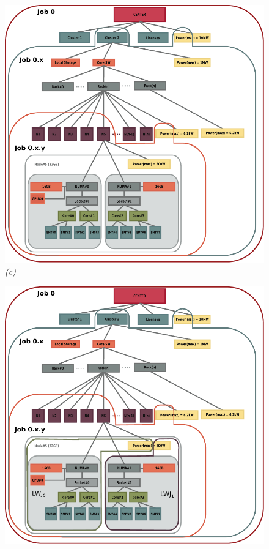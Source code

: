 \documentclass[10pt]{article}
\begin{document}
\begin{figure}
\begin{minipage}{0.5\linewidth}
  \begin{center}
  \includegraphics[scale=0.45]{../fig/job-hierarchy-job0-x-y}
  {\em (c)}
  \end{center}
\end{minipage}
\begin{minipage}{0.5\linewidth}
  \begin{center}
  \includegraphics[scale=0.45]{../fig/job-hierarchy-lwj}

\end{center}
\end{minipage}
\end{figure}
\end{document}
